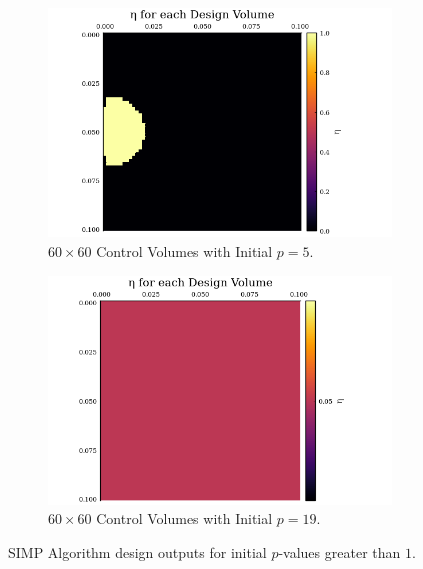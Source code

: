 \begin{figure}
	\begin{subfigure}{0.5\textwidth}
		\includegraphics[width=1.1\linewidth]{Chapter_III_Implementation_and_Results/Images/60x60-start-p=5-1iters.png}
		\caption{$60\times 60$ Control Volumes with Initial $p=5$.}
		\label{fig:start_p=5}
	\end{subfigure}
	\begin{subfigure}{0.5\textwidth}
	\includegraphics[width=1.1\linewidth]{Chapter_III_Implementation_and_Results/Images/60x60-start-p=19-3iters.png}
	\caption{$60\times 60$ Control Volumes with Initial $p=19$.}
	\label{fig:start_p=19}
\end{subfigure}
\caption[Designs with Higher Initial $p$]{SIMP Algorithm design outputs for initial $p$-values greater than $1$.}
\end{figure}

